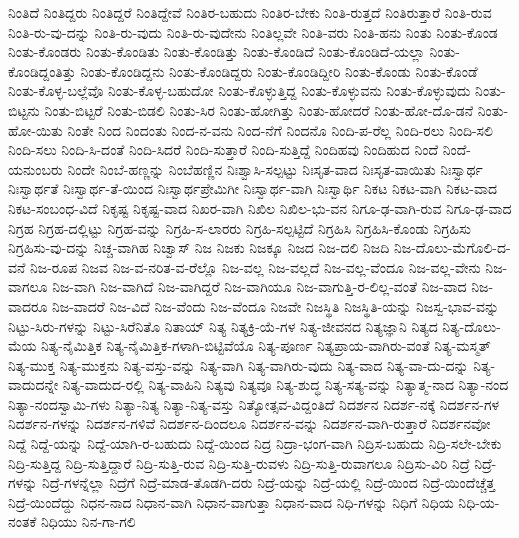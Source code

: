 {ನಿಂತಿದೆ
ನಿಂತಿದ್ದರು
ನಿಂತಿದ್ದರೆ
ನಿಂತಿದ್ದೇವೆ
ನಿಂತಿರ-ಬಹುದು
ನಿಂತಿರ-ಬೇಕು
ನಿಂತಿ-ರುತ್ತದೆ
ನಿಂತಿರುತ್ತಾರೆ
ನಿಂತಿ-ರುವ
ನಿಂತಿ-ರು-ವು-ದನ್ನು
ನಿಂತಿ-ರು-ವುದು
ನಿಂತಿ-ರು-ವುದೇನು
ನಿಂತಿಲ್ಲವೇ
ನಿಂತಿ-ವರು
ನಿಂತಿ-ಹನು
ನಿಂತು
ನಿಂತು-ಕೊಂಡ
ನಿಂತು-ಕೊಂಡರು
ನಿಂತು-ಕೊಂಡಿತು
ನಿಂತು-ಕೊಂಡಿತ್ತು
ನಿಂತು-ಕೊಂಡಿದೆ
ನಿಂತು-ಕೊಂಡಿದೆ-ಯಲ್ಲಾ
ನಿಂತು-ಕೊಂಡಿದ್ದಂತಿತ್ತು
ನಿಂತು-ಕೊಂಡಿದ್ದನು
ನಿಂತು-ಕೊಂಡಿದ್ದರು
ನಿಂತು-ಕೊಂಡಿದ್ದೀರಿ
ನಿಂತು-ಕೊಂಡು
ನಿಂತು-ಕೊಂಡೆ
ನಿಂತು-ಕೊಳ್ಳ-ಬಲ್ಲೆವೊ
ನಿಂತು-ಕೊಳ್ಳ-ಬಹುದೋ
ನಿಂತು-ಕೊಳ್ಳುತ್ತಿದ್ದ
ನಿಂತು-ಕೊಳ್ಳುವನು
ನಿಂತು-ಕೊಳ್ಳುವುದು
ನಿಂತು-ಬಿಟ್ಟನು
ನಿಂತು-ಬಿಟ್ಟರೆ
ನಿಂತು-ಬಿಡಲಿ
ನಿಂತು-ಸಿರ
ನಿಂತು-ಹೋಗಿತ್ತು
ನಿಂತು-ಹೋದರೆ
ನಿಂತು-ಹೋ-ದೊ-ಡನೆ
ನಿಂತು-ಹೋ-ಯಿತು
ನಿಂತೇ
ನಿಂದ
ನಿಂದಂತು
ನಿಂದ-ನ-ವನು
ನಿಂದ-ನೆಗೆ
ನಿಂದನೊ
ನಿಂದಿ-ಪ-ರೆಲ್ಲ
ನಿಂದಿ-ರಲು
ನಿಂದಿ-ಸಲಿ
ನಿಂದಿ-ಸಲು
ನಿಂದಿ-ಸಿ-ದಂತೆ
ನಿಂದಿ-ಸಿದರೆ
ನಿಂದಿ-ಸುತ್ತಾರೆ
ನಿಂದಿ-ಸುತ್ತಿದ್ದೆ
ನಿಂದಿಹವು
ನಿಂದಿಹುದ
ನಿಂದೆ
ನಿಂದೆ-ಯನುಂಬರು
ನಿಂದೇ
ನಿಂಬೆ-ಹಣ್ಣನ್ನು
ನಿಂಬೆಹಣ್ಣಿನ
ನಿಃಶ್ವಾಸಿ-ಸಲ್ಪಟ್ಟು
ನಿಃಸೃತ-ವಾದ
ನಿಃಸೃತ-ವಾಯಿತು
ನಿಃಸ್ವಾರ್ಥ
ನಿಃಸ್ವಾರ್ಥತೆ
ನಿಃಸ್ವಾರ್ಥ-ತೆ-ಯಿಂದ
ನಿಃಸ್ವಾರ್ಥಪ್ರೇಮಿಗೀ
ನಿಃಸ್ವಾರ್ಥ-ವಾಗಿ
ನಿಃಸ್ವಾರ್ಥಿ
ನಿಕಟ
ನಿಕಟ-ವಾಗಿ
ನಿಕಟ-ವಾದ
ನಿಕಟ-ಸಂಬಂಧ-ವಿದೆ
ನಿಕೃಷ್ಟ
ನಿಕೃಷ್ಟ-ವಾದ
ನಿಖರ-ವಾಗಿ
ನಿಖಿಲ
ನಿಖಿಲ-ಭು-ವನ
ನಿಗೂ-ಢ-ವಾಗಿ-ರುವ
ನಿಗೂ-ಢ-ವಾದ
ನಿಗ್ರಹ
ನಿಗ್ರಹ-ದಲ್ಲಿಟ್ಟು
ನಿಗ್ರಹ-ವನ್ನು
ನಿಗ್ರಹಿ-ಸ-ಲಾರರು
ನಿಗ್ರಹಿ-ಸಲ್ಪಟ್ಟಿದೆ
ನಿಗ್ರಹಿಸಿ
ನಿಗ್ರಹಿಸಿ-ಕೊಂಡು
ನಿಗ್ರಹಿಸು
ನಿಗ್ರಹಿಸು-ವು-ದನ್ನು
ನಿಚ್ಚ-ವಾಗಿಹ
ನಿಚ್ವಾಸ್
ನಿಜ
ನಿಜಕು
ನಿಜಕ್ಕೂ
ನಿಜದ
ನಿಜ-ದಲಿ
ನಿಜದಿ
ನಿಜ-ದೊಲು-ಮೆಗೊಲಿ-ದ-ವನೆ
ನಿಜ-ರೂಪ
ನಿಜವ
ನಿಜ-ವ-ನರಿತ-ವ-ರೆಲ್ಲೊ
ನಿಜ-ವಲ್ಲ
ನಿಜ-ವಲ್ಲದೆ
ನಿಜ-ವಲ್ಲ-ವೆಂದೂ
ನಿಜ-ವಲ್ಲ-ವೇನು
ನಿಜ-ವಾಗಲೂ
ನಿಜ-ವಾಗಿ
ನಿಜ-ವಾಗಿದೆ
ನಿಜ-ವಾಗಿದ್ದರೆ
ನಿಜ-ವಾಗಿಯೂ
ನಿಜ-ವಾಗುತ್ತಿ-ರ-ಲಿಲ್ಲ-ವಂತೆ
ನಿಜ-ವಾದ
ನಿಜ-ವಾದರೂ
ನಿಜ-ವಾದರೆ
ನಿಜ-ವಿದೆ
ನಿಜ-ವೆಂದು
ನಿಜ-ವೆಂದೂ
ನಿಜವೇ
ನಿಜಸ್ಥಿತಿ
ನಿಜಸ್ಥಿತಿ-ಯನ್ನು
ನಿಜಸ್ವ-ಭಾವ-ವನ್ನು
ನಿಟ್ಟು-ಸಿರು-ಗಳನ್ನು
ನಿಟ್ಟು-ಸಿರೆನಿತೊ
ನಿತಾಯ್
ನಿತ್ಯ
ನಿತ್ಯಕ್ರಿ-ಯೆ-ಗಳ
ನಿತ್ಯ-ಜೀವನದ
ನಿತ್ಯಜ್ಞಾನಿ
ನಿತ್ಯದ
ನಿತ್ಯ-ದೊಲು-ಮೆಯ
ನಿತ್ಯ-ನೈಮಿತ್ತಿಕ
ನಿತ್ಯ-ನೈಮಿತ್ತಿಕ-ಗಳಾಗಿ-ಬಿಟ್ಟಿವೆಯೊ
ನಿತ್ಯ-ಪೂರ್ಣ
ನಿತ್ಯಪ್ರಾಯ-ವಾಗಿರು-ವಂತೆ
ನಿತ್ಯ-ಮಸ್ಮತ್
ನಿತ್ಯ-ಮುಕ್ತ
ನಿತ್ಯ-ಮುಕ್ತನು
ನಿತ್ಯ-ವಸ್ತು-ವನ್ನು
ನಿತ್ಯ-ವಾಗಿ
ನಿತ್ಯ-ವಾಗಿರು-ವುದು
ನಿತ್ಯ-ವಾದ
ನಿತ್ಯ-ವಾ-ದು-ದನ್ನು
ನಿತ್ಯ-ವಾದುದನ್ನೇ
ನಿತ್ಯ-ವಾದುದ-ರಲ್ಲಿ
ನಿತ್ಯ-ವಾಹಿನಿ
ನಿತ್ಯವು
ನಿತ್ಯವೂ
ನಿತ್ಯ-ಶುದ್ಧ
ನಿತ್ಯ-ಸತ್ಯ-ವನ್ನು
ನಿತ್ಯಾತ್ಮ-ನಾದ
ನಿತ್ಯಾ-ನಂದ
ನಿತ್ಯಾ-ನಂದಸ್ವಾಮಿ-ಗಳು
ನಿತ್ಯಾ-ನಿತ್ಯ
ನಿತ್ಯಾ-ನಿತ್ಯ-ವಸ್ತು
ನಿತ್ಯೋತ್ಸವ-ವಿದ್ದಂತಿದೆ
ನಿದರ್ಶನ
ನಿದರ್ಶ-ನಕ್ಕೆ
ನಿದರ್ಶನ-ಗಳ
ನಿದರ್ಶನ-ಗಳನ್ನು
ನಿದರ್ಶನ-ಗಳಿವೆ
ನಿದರ್ಶನ-ದಿಂದಲೂ
ನಿದರ್ಶನ-ವನ್ನು
ನಿದರ್ಶನ-ವಾಗಿ-ರುತ್ತಾರೆ
ನಿದರ್ಶನವೋ
ನಿದ್ದೆ
ನಿದ್ದೆ-ಯನ್ನು
ನಿದ್ದೆ-ಯಾಗಿ-ರ-ಬಹುದು
ನಿದ್ದೆ-ಯಿಂದ
ನಿದ್ರ
ನಿದ್ರಾ-ಭಂಗ-ವಾಗಿ
ನಿದ್ರಿಸ-ಬಹುದು
ನಿದ್ರಿ-ಸಲೇ-ಬೇಕು
ನಿದ್ರಿ-ಸುತ್ತಿದ್ದ
ನಿದ್ರಿ-ಸುತ್ತಿದ್ದಾರೆ
ನಿದ್ರಿ-ಸುತ್ತಿ-ರುವ
ನಿದ್ರಿ-ಸುತ್ತಿ-ರುವಳು
ನಿದ್ರಿ-ಸುತ್ತಿ-ರುವಾಗಲೂ
ನಿದ್ರಿಸು-ವಿರಿ
ನಿದ್ರೆ
ನಿದ್ರೆ-ಗಳನ್ನು
ನಿದ್ರೆ-ಗಳನ್ನೆಲ್ಲಾ
ನಿದ್ರೆಗೆ
ನಿದ್ರೆ-ಮಾಡ-ತೊಡಗಿ-ದರು
ನಿದ್ರೆ-ಯನ್ನು
ನಿದ್ರೆ-ಯಲ್ಲಿ
ನಿದ್ರೆ-ಯಿಂದ
ನಿದ್ರೆ-ಯಿಂದೆಚ್ಚೆತ್ತ
ನಿದ್ರೆ-ಯಿಂದೆದ್ದು
ನಿಧನ-ನಾದ
ನಿಧಾನ-ವಾಗಿ
ನಿಧಾನ-ವಾಗುತ್ತಾ
ನಿಧಾನ-ವಾದ
ನಿಧಿ-ಗಳನ್ನು
ನಿಧಿಗೆ
ನಿಧಿಯ
ನಿಧಿ-ಯ-ನಂತಕೆ
ನಿಧಿಯು
ನಿನ-ಗಾ-ಗಲಿ
}
